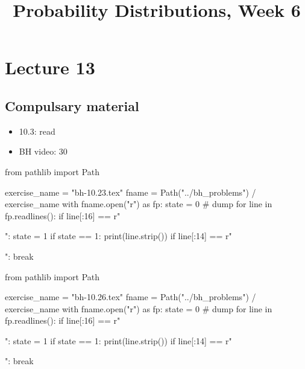 


\title{Probability Distributions, Week 6}


\maketitle
\toccontents


\section{Lecture 13}

\subsection{Compulsary material}
\label{sec:compulsary-material}



\begin{itemize}
\item 10.3: read
\item BH video: 30
\end{itemize}


\begin{pycode}
from pathlib import Path

exercise_name = "bh-10.23.tex"
fname = Path("../bh_problems") / exercise_name
with fname.open("r") as fp:
    state = 0  # dump
    for line in fp.readlines():
        if line[:16] == r"\begin{exercise}":
            state = 1
        if state == 1:
            print(line.strip())
        if line[:14] == r"\end{exercise}":
            break
\end{pycode}


\begin{pycode}
from pathlib import Path

exercise_name = "bh-10.26.tex"
fname = Path("../bh_problems") / exercise_name
with fname.open("r") as fp:
    state = 0  # dump
    for line in fp.readlines():
        if line[:16] == r"\begin{exercise}":
            state = 1
        if state == 1:
            print(line.strip())
        if line[:14] == r"\end{exercise}":
            break
\end{pycode}



